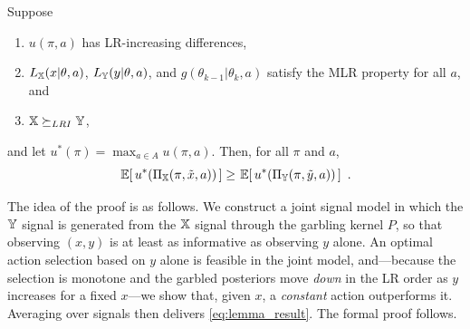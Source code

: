 \begin{lemma}\label{lemma:LRI-ContVal}
Suppose
\begin{enumerate}
\item $u(\pi,a)$ has LR-increasing differences,
\item $L_{\mathbb{X}}(x|\theta,a)$, $L_{\mathbb{Y}}(y|\theta,a)$, and
  $g(\theta_{k-1}|\theta_k,a)$ satisfy the MLR property for all $a$,
  and
\item ${\mathbb{X}} \succeq_{LRI} {\mathbb{Y}}$,
\end{enumerate}
and let $u^*(\pi) = \max_{a\in A} u(\pi, a)$. Then, for all $\pi$ and
$a$,
\begin{equation}
\ev{u^*(\Pi_\iX(\pi,\tilde{x},a))} \geq
\ev{u^*(\Pi_\iY(\pi,\tilde{y},a))} \ . \label{eq:lemma_result}
\end{equation}
\end{lemma}

The idea of the proof is as follows. We construct a joint signal model
in which the ${\mathbb{Y}}$ signal is generated from the ${\mathbb{X}}$ signal through
the garbling kernel $P$, so that observing $(x,y)$ is at least as
informative as observing $y$ alone. An optimal action selection based
on $y$ alone is feasible in the joint model, and---because the
selection is monotone and the garbled posteriors move \emph{down} in
the LR order as $y$ increases for a fixed $x$---we show that, given
$x$, a \emph{constant} action outperforms it. Averaging over signals
then delivers \eqref{eq:lemma_result}. The formal proof follows.

